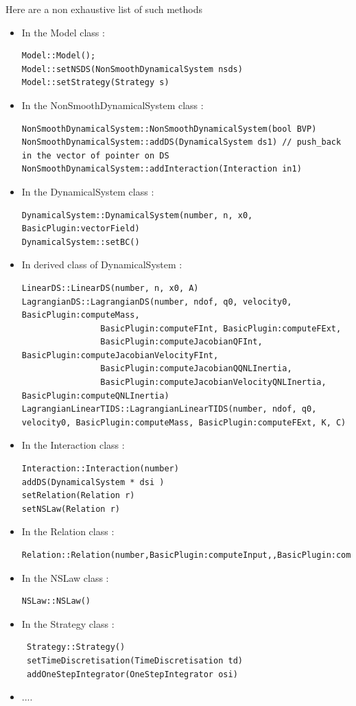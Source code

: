  Here are a non exhaustive list of such methods

 \begin{itemize}
 \item In the Model class :
\begin{verbatim}
Model::Model();
Model::setNSDS(NonSmoothDynamicalSystem nsds)
Model::setStrategy(Strategy s)
\end{verbatim}
 \item In the NonSmoothDynamicalSystem class :
\begin{verbatim}
NonSmoothDynamicalSystem::NonSmoothDynamicalSystem(bool BVP)
NonSmoothDynamicalSystem::addDS(DynamicalSystem ds1) // push_back in the vector of pointer on DS
NonSmoothDynamicalSystem::addInteraction(Interaction in1) 
\end{verbatim}  
 \item In the DynamicalSystem class :
\begin{verbatim}
DynamicalSystem::DynamicalSystem(number, n, x0, BasicPlugin:vectorField)
DynamicalSystem::setBC()
\end{verbatim}
 \item In derived class of DynamicalSystem :
\begin{verbatim}
LinearDS::LinearDS(number, n, x0, A)
LagrangianDS::LagrangianDS(number, ndof, q0, velocity0, BasicPlugin:computeMass,
                BasicPlugin:computeFInt, BasicPlugin:computeFExt,
                BasicPlugin:computeJacobianQFInt, BasicPlugin:computeJacobianVelocityFInt,
                BasicPlugin:computeJacobianQQNLInertia,
                BasicPlugin:computeJacobianVelocityQNLInertia, BasicPlugin:computeQNLInertia)
LagrangianLinearTIDS::LagrangianLinearTIDS(number, ndof, q0, velocity0, BasicPlugin:computeMass, BasicPlugin:computeFExt, K, C)
\end{verbatim}

   
          \item In the Interaction class :
\begin{verbatim}
Interaction::Interaction(number)
addDS(DynamicalSystem * dsi )
setRelation(Relation r)
setNSLaw(Relation r)
\end{verbatim}
          \item In the Relation class :
\begin{verbatim}
Relation::Relation(number,BasicPlugin:computeInput,,BasicPlugin:computeOutput)
\end{verbatim}
          \item In the NSLaw class :
\begin{verbatim}
NSLaw::NSLaw()
\end{verbatim}
 \item In the Strategy class :
\begin{verbatim}
 Strategy::Strategy()
 setTimeDiscretisation(TimeDiscretisation td)
 addOneStepIntegrator(OneStepIntegrator osi) 
\end{verbatim}    
\item ....
 \end{itemize}





